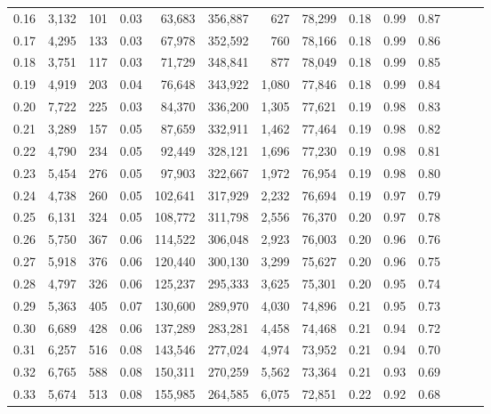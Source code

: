 \begin{tabular}{rrrrrrrrrrrrrr}
0.16 &   3,132 &    101 &  0.03 &   63,683 &  356,887 &     627 &  78,299 &  0.18 &  0.99 &      0.87 \\
0.17 &   4,295 &    133 &  0.03 &   67,978 &  352,592 &     760 &  78,166 &  0.18 &  0.99 &      0.86 \\
0.18 &   3,751 &    117 &  0.03 &   71,729 &  348,841 &     877 &  78,049 &  0.18 &  0.99 &      0.85 \\
0.19 &   4,919 &    203 &  0.04 &   76,648 &  343,922 &   1,080 &  77,846 &  0.18 &  0.99 &      0.84 \\
0.20 &   7,722 &    225 &  0.03 &   84,370 &  336,200 &   1,305 &  77,621 &  0.19 &  0.98 &      0.83 \\
0.21 &   3,289 &    157 &  0.05 &   87,659 &  332,911 &   1,462 &  77,464 &  0.19 &  0.98 &      0.82 \\
0.22 &   4,790 &    234 &  0.05 &   92,449 &  328,121 &   1,696 &  77,230 &  0.19 &  0.98 &      0.81 \\
0.23 &   5,454 &    276 &  0.05 &   97,903 &  322,667 &   1,972 &  76,954 &  0.19 &  0.98 &      0.80 \\
0.24 &   4,738 &    260 &  0.05 &  102,641 &  317,929 &   2,232 &  76,694 &  0.19 &  0.97 &      0.79 \\
0.25 &   6,131 &    324 &  0.05 &  108,772 &  311,798 &   2,556 &  76,370 &  0.20 &  0.97 &      0.78 \\
0.26 &   5,750 &    367 &  0.06 &  114,522 &  306,048 &   2,923 &  76,003 &  0.20 &  0.96 &      0.76 \\
0.27 &   5,918 &    376 &  0.06 &  120,440 &  300,130 &   3,299 &  75,627 &  0.20 &  0.96 &      0.75 \\
0.28 &   4,797 &    326 &  0.06 &  125,237 &  295,333 &   3,625 &  75,301 &  0.20 &  0.95 &      0.74 \\
0.29 &   5,363 &    405 &  0.07 &  130,600 &  289,970 &   4,030 &  74,896 &  0.21 &  0.95 &      0.73 \\
0.30 &   6,689 &    428 &  0.06 &  137,289 &  283,281 &   4,458 &  74,468 &  0.21 &  0.94 &      0.72 \\
0.31 &   6,257 &    516 &  0.08 &  143,546 &  277,024 &   4,974 &  73,952 &  0.21 &  0.94 &      0.70 \\
0.32 &   6,765 &    588 &  0.08 &  150,311 &  270,259 &   5,562 &  73,364 &  0.21 &  0.93 &      0.69 \\
0.33 &   5,674 &    513 &  0.08 &  155,985 &  264,585 &   6,075 &  72,851 &  0.22 &  0.92 &      0.68 \\

\end{tabular}
